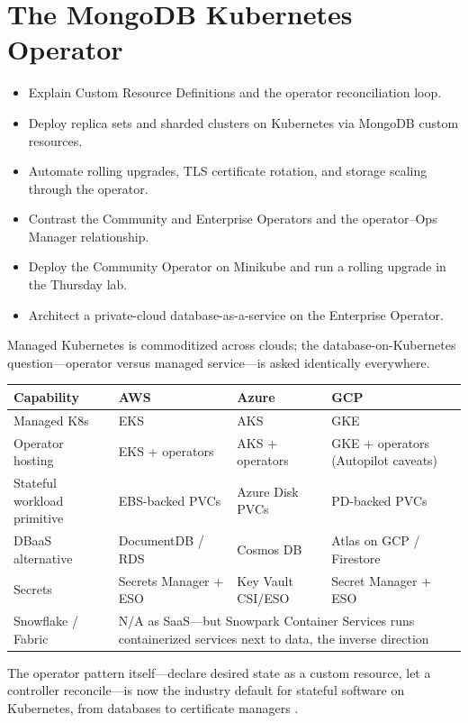 \chapter{The MongoDB Kubernetes Operator}
%

\begin{objectives}
\begin{itemize}
    \item Explain Custom Resource Definitions and the operator reconciliation loop.
    \item Deploy replica sets and sharded clusters on Kubernetes via MongoDB custom resources.
    \item Automate rolling upgrades, TLS certificate rotation, and storage scaling through the operator.
    \item Contrast the Community and Enterprise Operators and the operator--Ops Manager relationship.
    \item Deploy the Community Operator on Minikube and run a rolling upgrade in the Thursday lab.
    \item Architect a private-cloud database-as-a-service on the Enterprise Operator.
\end{itemize}
\end{objectives}

\begin{crosscloud}
Managed Kubernetes is commoditized across clouds; the database-on-Kubernetes question---operator versus managed service---is asked identically everywhere.

\vspace{2mm}
{\footnotesize
\begin{tabular}{@{}p{2.9cm}p{3.0cm}p{3.0cm}p{3.0cm}@{}} 
\toprule
\textbf{Capability} & \textbf{AWS} & \textbf{Azure} & \textbf{GCP} \\
\midrule
Managed K8s & EKS & AKS & GKE \\
Operator hosting & EKS + operators & AKS + operators & GKE + operators (Autopilot caveats) \\
Stateful workload primitive & EBS-backed PVCs & Azure Disk PVCs & PD-backed PVCs \\
DBaaS alternative & DocumentDB / RDS & Cosmos DB & Atlas on GCP / Firestore \\
Secrets & Secrets Manager + ESO & Key Vault CSI/ESO & Secret Manager + ESO \\
\addlinespace
Snowflake / Fabric & \multicolumn{3}{l}{N/A as SaaS---but Snowpark Container Services runs containerized services next to data, the inverse direction} \\
\bottomrule
\end{tabular}}

\vspace{1mm}
The operator pattern itself---declare desired state as a custom resource, let a controller reconcile---is now the industry default for stateful software on Kubernetes, from databases to certificate managers \cite{mongodbK8sOperatorDocs,kubernetesDocs}.
\end{crosscloud}

